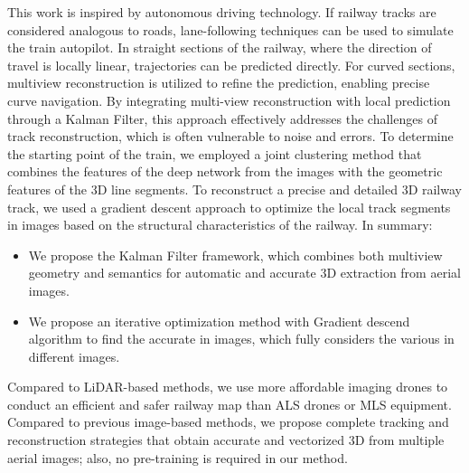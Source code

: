 This work is inspired by autonomous driving technology. 
If railway tracks are considered analogous to roads, lane-following techniques can be used to simulate the train autopilot. 
In straight sections of the railway, where the direction of travel is locally linear, trajectories can be predicted directly. 
For curved sections, multiview reconstruction is utilized to refine the prediction, enabling precise curve navigation. 
By integrating multi-view reconstruction with local prediction through a Kalman Filter,
this approach effectively addresses the challenges of track reconstruction, 
which is often vulnerable to noise and errors.
To determine the starting point of the train, we employed a joint clustering method that combines the features of the deep network from the images with the geometric features of the 3D line segments. 
To reconstruct a precise and detailed 3D railway track, we used a gradient descent approach to optimize the local track segments in images based on the structural characteristics of the railway.
In summary:
\vspace{-0.5em}
\begin{itemize}
    \item We propose the Kalman Filter framework, which combines both multiview geometry and semantics for automatic and accurate 3D \rl extraction from aerial images.
    \vspace{-0.5em}
    \item We propose an iterative optimization method with Gradient descend algorithm to find the accurate \rl in images, 
    which fully considers the \rl various in different images.
\end{itemize}
\vspace{-0.5em}
Compared to LiDAR-based methods,
we use more affordable imaging drones to conduct an efficient and safer railway map than ALS drones or MLS equipment.
Compared to previous image-based methods,
we propose complete tracking and reconstruction strategies that obtain accurate and vectorized 3D \rl from multiple aerial images;
also,
no pre-training is required in our method.





























